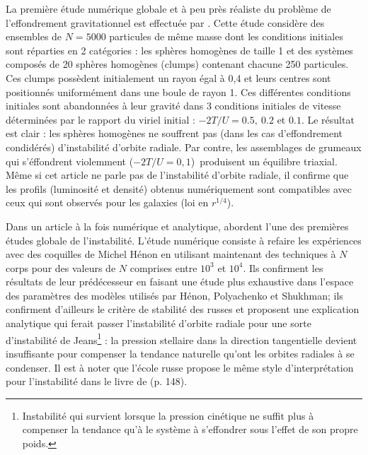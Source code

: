 La première étude numérique globale et à peu près réaliste du problème de l'effondrement gravitationnel est effectuée par  \cite{albada}. Cette étude
considère des ensembles de $N=5000$ particules de même masse dont les conditions initiales sont réparties en 2 catégories : les sphères homogènes de
taille 1 et des systèmes composés de 20 sphères homogènes (clumps) contenant chacune 250 particules. Ces clumps possèdent initialement un rayon égal à
0,4 et leurs centres sont positionnés uniformément dans une boule de rayon 1$.$ Ces différentes conditions initiales sont abandonnées à leur gravité
dans 3 conditions initiales de vitesse déterminées par le rapport du viriel initial : $-2T/U=0.5,~0.2$ et $0.1$. Le résultat est clair : les sphères
homogènes ne souffrent pas (dans les cas d'effondrement condidérés) d'instabilité d'orbite radiale. Par contre, les assemblages de grumeaux qui
s'éffondrent violemment ($-2T/U=0,1$)~produisent un équilibre triaxial. Même si cet article ne parle pas de l'instabilité d'orbite radiale, il confirme
que les profils (luminosité et densité) obtenus numériquement sont compatibles avec ceux qui sont observés pour les galaxies (loi en $r^{1/4}$).

Dans un article à la fois numérique et analytique, \cite{barneshut} abordent l'une des premières études globale de l'instabilité. L'étude numérique
consiste à refaire les expériences avec des coquilles de Michel Hénon en utilisant maintenant des techniques à $N$ corps pour des valeurs de $N$
comprises entre $10^{3}$ et $10^{4}$. Ils confirment les résultats de leur prédécesseur en faisant une étude plus exhaustive dans l'espace des
paramètres des modèles utilisés par Hénon, Polyachenko et Shukhman;  ils confirment d'ailleurs le critère de stabilité des russes et proposent une
explication analytique qui ferait passer l'instabilité d'orbite radiale pour une sorte d'instabilité de
Jeans\footnote{Instabilité qui survient lorsque la pression cinétique ne suffit plus à compenser la tendance qu'à le système à s'effondrer sous
l'effet de son propre poids.} : la pression stellaire dans la direction tangentielle devient insuffisante pour compenser la tendance naturelle qu'ont
les orbites radiales à se condenser. Il est à noter que l'école russe propose le même style d'interprétation pour l'instabilité dans le livre de
\citet{1984pgs2.book.....F} (p. 148).

